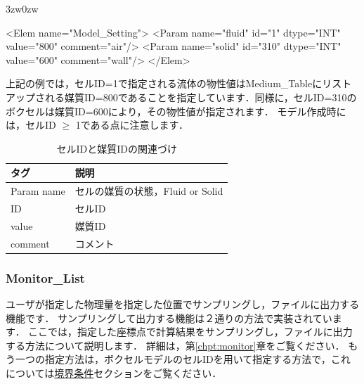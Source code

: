 \begin{indentation}{3zw}{0zw}

{\small
\begin{program}
<Elem name="Model_Setting">
  <Param name="fluid" id="1"    dtype="INT" value="800"  comment="air"/>
  <Param name="solid" id="310"  dtype="INT" value="600"  comment="wall"/>
</Elem>
\end{program}
}

上記の例では，セルID=1で指定される流体の物性値はMedium\_Tableにリストアップされる媒質ID=800であることを指定しています．同様に，セルID=310のボクセルは媒質ID=600により，その物性値が指定されます．
モデル作成時には，セルID $\ge$ 1である点に注意します．

\begin{table}[htdp]
\caption{セルIDと媒質IDの関連づけ}
\begin{center}
\small
\begin{tabular}{ll} \toprule
タグ & 説明\\ \midrule
Param name & セルの媒質の状態，Fluid or Solid\\
ID & セルID\\
value & 媒質ID\\
comment & コメント\\ \bottomrule
\end{tabular}
\end{center}
\label{tbl:model_tag}
\end{table}

\end{indentation}



\pagebreak
\subsubsection{Monitor\_List}

ユーザが指定した物理量を指定した位置で\hypertarget{tgt:monitor_list}{サンプリング}し，ファイルに出力する機能です．
サンプリングして出力する機能は２通りの方法で実装されています．
ここでは，指定した座標点で計算結果をサンプリングし，ファイルに出力する方法について説明します．
詳細は，第\ref{chpt:monitor}章をご覧ください．
もう一つの指定方法は，ボクセルモデルのセルIDを用いて指定する方法で，これについては\hyperlink{tgt:innerboundary}{境界条件}セクションをご覧ください．

